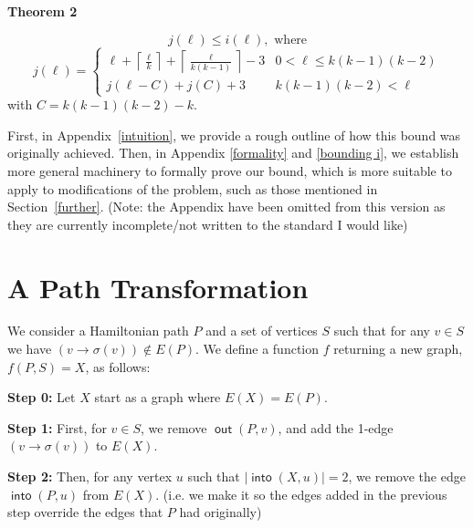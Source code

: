 \documentclass{article}
\DeclareMathOperator{\out}{\bm{\mathsf{out}}}
\DeclareMathOperator{\into}{\bm{\mathsf{into}}}
\newcommand{\edit}[1]{}%
\newcommand{\dc}[1]{}%
\begin{document}
\textbf{Theorem 2}\edit{ amsthm; not sure what to classify this result}

\[j(\ell) \le i(\ell), \text{ where}\]
\[j(\ell) = \begin{cases} 
\ell + \left\lceil \frac{\ell}{k}\right\rceil + \left\lceil \frac{\ell}{k(k-1)}\right\rceil -3 & 0 < \ell \leq k(k-1)(k-2)\\
j(\ell-C) + j(C)+3 & k(k-1)(k-2) < \ell
\end{cases} \]
with $C = k(k-1)(k-2)-k$.

First, in Appendix~\ref{intuition}, we provide a rough outline of how this bound was originally achieved. Then, in Appendix \ref{formality} and \ref{bounding i}, we establish more general machinery to formally prove our bound, which is more suitable to apply to modifications of the problem, such as those mentioned in Section~\ref{further}. (Note: the Appendix have been omitted from this version as they are currently incomplete/not written to the standard I would like)

\section{A Path Transformation} \label{function}

We consider a Hamiltonian path $P$ and a set of vertices $S$ such that for any $v \in S$ we have $(v \to \sigma(v)) \not \in E(P)$. We define a function $f$ returning a new graph, $f(P, S)=X$, as follows: 

\vspace{1.75em}\dc{ use enumerate environment or algorithm environment (algorithm2e)}

\textbf{Step 0:} Let $X$ start as a graph where $E(X) = E(P)$.

\textbf{Step 1:} First, for $v \in S$, we remove $\out(P,v)$, and add the 1-edge $(v \to \sigma(v))$ to $E(X)$. 

\textbf{Step 2:} Then, for any vertex $u$ such that $|\into(X,u)| = 2$, we remove the edge $\into(P,u)$ from $E(X)$. (i.e. we make it so the edges added in the previous step override the edges that $P$ had originally)

\dc{Another thought: you can split step 1 into two steps or refactor, so it is either (1) add the 1-edge, (2) remove out-edges, (3) remove in-edges; or (1) add the 1-edge, (2) remove original edges until $X$ has only in-/out-degree $\le1$ vertices, which is to remove [this set of out-edges] and [this set of in-edges]. The benefit of doing this is that it is more obvious what the construction accomplishes and it makes Remark 1 more obvious.}
\end{document}
